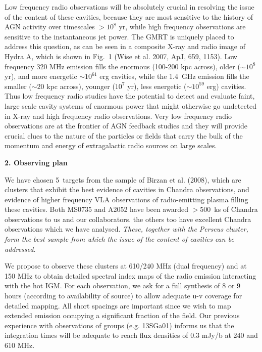 \documentclass{article}
\begin{document}
Low frequency radio observations will be absolutely crucial in
resolving the issue of the content of these cavities, 
 because they are most
sensitive to the history of AGN activity over timescales $> 10^8$ yr,
while high frequency observations are sensitive to the instantaneous
jet power.  The GMRT is uniquely placed to address this question, as
can be seen in a composite X-ray and radio image of
Hydra A, which is shown in Fig.~1 (Wise et al. 2007, ApJ, 659, 1153).
Low frequency 320 MHz emission fills the enormous (100-200 kpc
across), older ($\sim 10^8$ yr), and more energetic $\sim 10^{61}$ 
erg cavities,
while the 1.4~GHz emission fills the smaller ($\sim 20$ kpc across), 
younger
($10^7$ yr), less energetic ($\sim 10^{59}$ erg) cavities.  
Thus low frequency
radio studies have the potential to detect and evaluate faint, large
scale cavity systems of enormous power that might otherwise go
undetected in X-ray and high frequency radio observations.  Very low
frequency radio observations are at the frontier of AGN feedback
studies and they will provide crucial clues to the nature of the
particles or fields that carry the bulk of the momentum and energy of
extragalactic radio sources on large scales.








\medskip
{\bf 2. Observing plan}

We have chosen 5~targets from the sample of Birzan et al. (2008), which are clusters that exhibit the best evidence of cavities in Chandra observations,
and evidence of higher frequency VLA observations of radio-emitting plasma 
filling these cavities.
Both MS0735 and A2052 have 
been awarded $>$500~ks of Chandra observations to us and
our collaborators. the others too have excellent Chandra observations which we have analysed. {\it These, together with the Perseus cluster, form the best sample from which the issue of the content of cavities can be addressed}.

We propose to observe these clusters at 610/240 MHz (dual frequency)
and at 150 MHz to obtain detailed spectral index maps of the radio
emission interacting with the hot IGM. For each observation, we ask
for a full synthesis of 8 or 9 hours (according to availability of
source) to allow adequate u-v coverage for detailed mapping. All short
spacings are important since we wish to map extended emission
occupying a significant fraction of the field. Our previous experience
with observations of groups (e.g. 13SGa01) informs us that the 
integration times will be adequate to reach flux densities of 0.3 mJy/b
at 240 and 610 MHz. 
\end{document}
